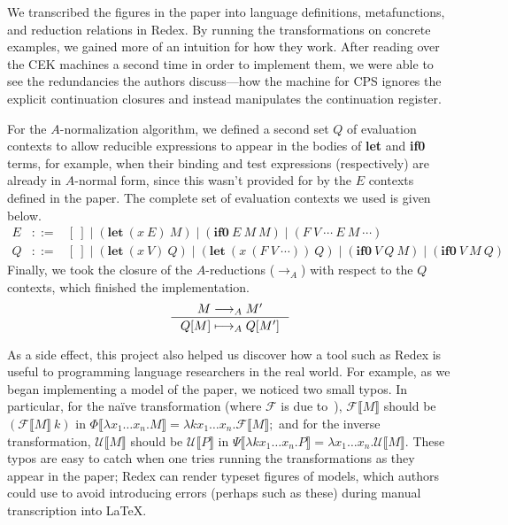 \documentclass[11pt]{article}
\begin{document}
We transcribed the figures in the paper into language definitions,
metafunctions, and reduction relations in Redex. By running the transformations
on concrete examples, we gained more of an intuition for how they work. After
reading over the CEK machines a second time in order to implement them, we were
able to see the redundancies the authors discuss---how the machine for CPS
ignores the explicit continuation closures and instead manipulates the
continuation register.

For the $A$-normalization algorithm, we defined a second set $Q$ of evaluation
contexts to allow reducible expressions to appear in the bodies of \textbf{let}
and \textbf{if0} terms, for example, when their binding and test expressions
(respectively) are already in $A$-normal form, since this wasn't provided for
by the $E$ contexts defined in the paper.
%
The complete set of evaluation contexts we used is given below.
\[
\begin{array}{lcl}
  E & ::= & [\ ]\; |\; (\textbf{let}\ (x\ E)\ M)\; |\;
  (\textbf{if0}\ E\ M\ M)\; |\; (F\ V\ \cdots\ E\ M\ \cdots) \\[3pt]
  Q & ::= & [\ ]\; |\; (\textbf{let}\ (x\ V)\ Q)\; |\;
  (\textbf{let}\ (x\ (F\ V\ \cdots))\ Q)\; |\;
  (\textbf{if0}\ V\ Q\ M)\; |\; (\textbf{if0}\ V\ M\ Q)
\end{array}
\]
Finally, we took the closure of the $A$-reductions ($\longrightarrow_A$) with
respect to the $Q$ contexts, which finished the implementation.
\[
\inference{
  M \longrightarrow_A M'
}{
  Q[M] \longmapsto_A Q[M']
}
\]

As a side effect, this project also helped us discover how a tool such as Redex
is useful to programming language researchers in the real world. For example,
as we began implementing a model of the paper, we noticed two small typos. In
particular, for the na\"{i}ve transformation (where $\mathcal{F}$ is due
to~\citet{Fischer:1993ys}), $\mathcal{F}\llbracket{M\rrbracket}$ should be
$(\mathcal{F}\llbracket{M\rrbracket}\ k)$ in
$\Phi\llbracket{\lambda{x_1 \ldots x_n}.M\rrbracket} =
\lambda{k x_1 \ldots x_n}.\mathcal{F}\llbracket{M\rrbracket};$
and for the inverse transformation,
$\mathcal{U}\llbracket{M\rrbracket}$ should be
$\mathcal{U}\llbracket{P\rrbracket}$ in
$\Psi\llbracket{\lambda{k x_1 \ldots x_n}.P\rrbracket} =
\lambda{x_1 \ldots x_n}.\mathcal{U}\llbracket{M\rrbracket}.$
These typos are easy to catch when one tries running the transformations as
they appear in the paper; Redex can render typeset figures of models, which
authors could use to avoid introducing errors (perhaps such as these) during
manual transcription into \LaTeX.
%
\end{document}
